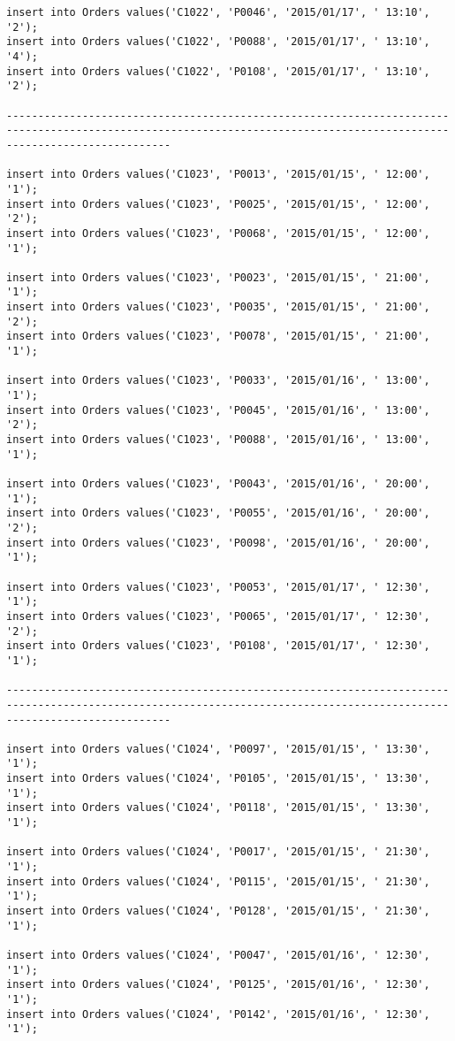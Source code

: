 \documentclass[a4,12pt]{report}
\begin{document}
\begin{lstlisting}
insert into Orders values('C1022', 'P0046', '2015/01/17', ' 13:10', '2');
insert into Orders values('C1022', 'P0088', '2015/01/17', ' 13:10', '4');
insert into Orders values('C1022', 'P0108', '2015/01/17', ' 13:10', '2');

----------------------------------------------------------------------------------------------------------------------------------------------------------------------

insert into Orders values('C1023', 'P0013', '2015/01/15', ' 12:00', '1');
insert into Orders values('C1023', 'P0025', '2015/01/15', ' 12:00', '2');
insert into Orders values('C1023', 'P0068', '2015/01/15', ' 12:00', '1');

insert into Orders values('C1023', 'P0023', '2015/01/15', ' 21:00', '1');
insert into Orders values('C1023', 'P0035', '2015/01/15', ' 21:00', '2');
insert into Orders values('C1023', 'P0078', '2015/01/15', ' 21:00', '1');

insert into Orders values('C1023', 'P0033', '2015/01/16', ' 13:00', '1');
insert into Orders values('C1023', 'P0045', '2015/01/16', ' 13:00', '2');
insert into Orders values('C1023', 'P0088', '2015/01/16', ' 13:00', '1');

insert into Orders values('C1023', 'P0043', '2015/01/16', ' 20:00', '1');
insert into Orders values('C1023', 'P0055', '2015/01/16', ' 20:00', '2');
insert into Orders values('C1023', 'P0098', '2015/01/16', ' 20:00', '1');

insert into Orders values('C1023', 'P0053', '2015/01/17', ' 12:30', '1');
insert into Orders values('C1023', 'P0065', '2015/01/17', ' 12:30', '2');
insert into Orders values('C1023', 'P0108', '2015/01/17', ' 12:30', '1');

----------------------------------------------------------------------------------------------------------------------------------------------------------------------

insert into Orders values('C1024', 'P0097', '2015/01/15', ' 13:30', '1');
insert into Orders values('C1024', 'P0105', '2015/01/15', ' 13:30', '1');
insert into Orders values('C1024', 'P0118', '2015/01/15', ' 13:30', '1');

insert into Orders values('C1024', 'P0017', '2015/01/15', ' 21:30', '1');
insert into Orders values('C1024', 'P0115', '2015/01/15', ' 21:30', '1');
insert into Orders values('C1024', 'P0128', '2015/01/15', ' 21:30', '1');

insert into Orders values('C1024', 'P0047', '2015/01/16', ' 12:30', '1');
insert into Orders values('C1024', 'P0125', '2015/01/16', ' 12:30', '1');
insert into Orders values('C1024', 'P0142', '2015/01/16', ' 12:30', '1');



\end{lstlisting}
\end{document}
